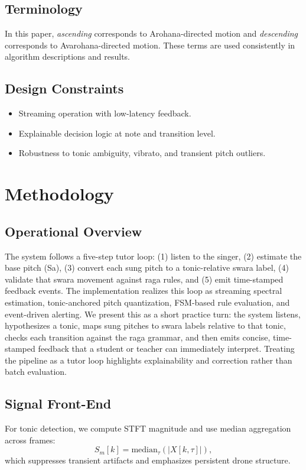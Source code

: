 \documentclass{ieeeaccess}
\begin{document}
\subsection{Terminology}
In this paper, \textit{ascending} corresponds to Arohana-directed motion and \textit{descending} corresponds to Avarohana-directed motion. These terms are used consistently in algorithm descriptions and results.

\subsection{Design Constraints}
\begin{itemize}
\item Streaming operation with low-latency feedback.
\item Explainable decision logic at note and transition level.
\item Robustness to tonic ambiguity, vibrato, and transient pitch outliers.
\end{itemize}

\section{Methodology}
\label{sec:method}
\subsection{Operational Overview}
The system follows a five-step tutor loop: (1) listen to the singer, (2) estimate the base pitch (Sa), (3) convert each sung pitch to a tonic-relative swara label, (4) validate that swara movement against raga rules, and (5) emit time-stamped feedback events. The implementation realizes this loop as streaming spectral estimation, tonic-anchored pitch quantization, FSM-based rule evaluation, and event-driven alerting.
We present this as a short practice turn: the system listens, hypothesizes a tonic, maps sung pitches to swara labels relative to that tonic, checks each transition against the raga grammar, and then emits concise, time-stamped feedback that a student or teacher can immediately interpret. Treating the pipeline as a tutor loop highlights explainability and correction rather than batch evaluation.

\subsection{Signal Front-End}
For tonic detection, we compute STFT magnitude and use median aggregation across frames:
\begin{equation}
S_m[k]=\text{median}_{\tau}(|X[k,\tau]|),
\end{equation}
which suppresses transient artifacts and emphasizes persistent drone structure.
\end{document}
